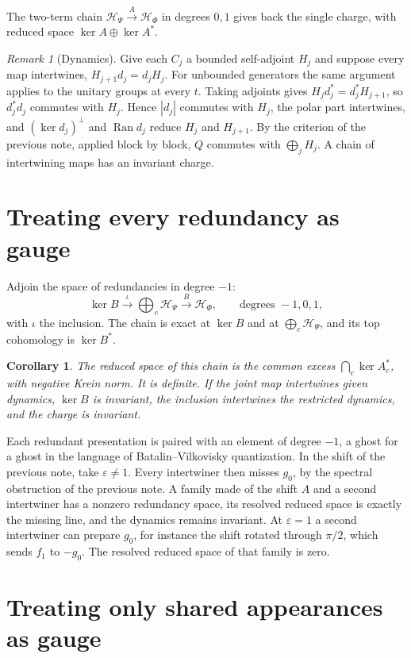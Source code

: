 \documentclass[11pt]{article}
\newtheorem{corollary}[theorem]{Corollary}
\theoremstyle{remark}
\newtheorem{remark}[theorem]{Remark}
\newcommand{\HP}{\mathcal H_\Psi}
\newcommand{\HF}{\mathcal H_\Phi}
\newcommand{\Ran}{\operatorname{Ran}}
\begin{document}
The two-term chain $\HP\xrightarrow{A}\HF$ in degrees $0,1$ gives back the single charge, with reduced space $\ker A\oplus\ker A^*$.

\begin{remark}[Dynamics]
Give each $C_j$ a bounded self-adjoint $H_j$ and suppose every map intertwines, $H_{j+1}d_j=d_jH_j$. For unbounded generators the same argument applies to the unitary groups at every $t$. Taking adjoints gives $H_jd_j^*=d_j^*H_{j+1}$, so $d_j^*d_j$ commutes with $H_j$. Hence $|d_j|$ commutes with $H_j$, the polar part intertwines, and $(\ker d_j)^\perp$ and $\Ran d_j$ reduce $H_j$ and $H_{j+1}$. By the criterion of the previous note, applied block by block, $Q$ commutes with $\bigoplus_jH_j$. A chain of intertwining maps has an invariant charge.
\end{remark}

\section{Treating every redundancy as gauge}

Adjoin the space of redundancies in degree $-1$:
\[
 \ker B\xrightarrow{\ \iota\ }\bigoplus_c\HP\xrightarrow{\ B\ }\HF,
 \qquad\text{degrees }-1,0,1,
\]
with $\iota$ the inclusion. The chain is exact at $\ker B$ and at $\bigoplus_c\HP$, and its top cohomology is $\ker B^*$.

\begin{corollary}\label{cor:resolved}
The reduced space of this chain is the common excess $\bigcap_c\ker A_c^*$, with negative Krein norm. It is definite. If the joint map intertwines given dynamics, $\ker B$ is invariant, the inclusion intertwines the restricted dynamics, and the charge is invariant.
\end{corollary}

Each redundant presentation is paired with an element of degree $-1$, a ghost for a ghost in the language of Batalin--Vilkovisky quantization. In the shift of the previous note, take $\varepsilon\ne1$. Every intertwiner then misses $g_0$, by the spectral obstruction of the previous note. A family made of the shift $A$ and a second intertwiner has a nonzero redundancy space, its resolved reduced space is exactly the missing line, and the dynamics remains invariant. At $\varepsilon=1$ a second intertwiner can prepare $g_0$, for instance the shift rotated through $\pi/2$, which sends $f_1$ to $-g_0$. The resolved reduced space of that family is zero.

\section{Treating only shared appearances as gauge}
\end{document}
